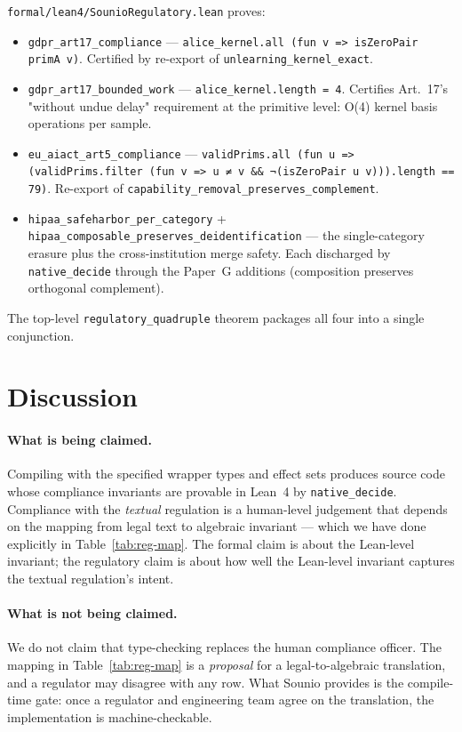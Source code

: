 \documentclass{article}
\begin{document}
\texttt{formal/lean4/SounioRegulatory.lean} proves:

\begin{itemize}
\item \texttt{gdpr\_art17\_compliance} ---
      \texttt{alice\_kernel.all (fun v => isZeroPair primA v)}.
      Certified by re-export of \texttt{unlearning\_kernel\_exact}.
\item \texttt{gdpr\_art17\_bounded\_work} ---
      \texttt{alice\_kernel.length = 4}.  Certifies Art.~17's "without
      undue delay" requirement at the primitive level: O(4) kernel
      basis operations per sample.
\item \texttt{eu\_aiact\_art5\_compliance} ---
      \texttt{validPrims.all (fun u => (validPrims.filter (fun v => u ≠ v
      \&\& ¬(isZeroPair u v))).length == 79)}.  Re-export of
      \texttt{capability\_removal\_preserves\_complement}.
\item \texttt{hipaa\_safeharbor\_per\_category} +
      \texttt{hipaa\_composable\_preserves\_deidentification} ---
      the single-category erasure plus the cross-institution merge
      safety.  Each discharged by \texttt{native\_decide} through the
      Paper~G additions (composition preserves orthogonal complement).
\end{itemize}

The top-level \texttt{regulatory\_quadruple} theorem packages all four
into a single conjunction.

\section{Discussion}

\paragraph{What is being claimed.}
Compiling with the specified wrapper types and effect sets produces
source code whose compliance invariants are provable in Lean~4 by
\texttt{native\_decide}.  Compliance with the \emph{textual} regulation
is a human-level judgement that depends on the mapping from legal text
to algebraic invariant --- which we have done explicitly in
Table~\ref{tab:reg-map}.  The formal claim is about the Lean-level
invariant; the regulatory claim is about how well the Lean-level
invariant captures the textual regulation's intent.

\paragraph{What is not being claimed.}
We do not claim that type-checking replaces the human compliance
officer.  The mapping in Table~\ref{tab:reg-map} is a \emph{proposal}
for a legal-to-algebraic translation, and a regulator may disagree with
any row.  What Sounio provides is the compile-time gate: once a regulator
and engineering team agree on the translation, the implementation is
machine-checkable.
\end{document}
